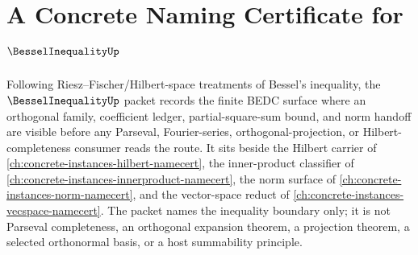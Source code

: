 \chapter{A Concrete Naming Certificate for $\BesselInequalityUp$}
\label{ch:concrete-instances-bessel-inequality-namecert}

Following Riesz--Fischer/Hilbert-space treatments of Bessel's inequality, the $\BesselInequalityUp$ packet records the finite BEDC surface where an orthogonal family, coefficient ledger, partial-square-sum bound, and norm handoff are visible before any Parseval, Fourier-series, orthogonal-projection, or Hilbert-completeness consumer reads the route. It sits beside the Hilbert carrier of \autoref{ch:concrete-instances-hilbert-namecert}, the inner-product classifier of \autoref{ch:concrete-instances-innerproduct-namecert}, the norm surface of \autoref{ch:concrete-instances-norm-namecert}, and the vector-space reduct of \autoref{ch:concrete-instances-vecspace-namecert}. The packet names the inequality boundary only; it is not Parseval completeness, an orthogonal expansion theorem, a projection theorem, a selected orthonormal basis, or a host summability principle.

